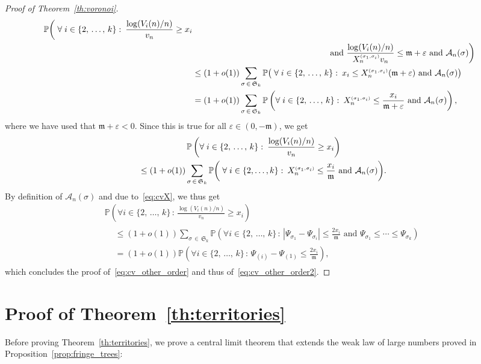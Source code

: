\documentclass[10pt]{amsart}
\theoremstyle{definition}\newtheorem{defi}[theo]{Definition}\newtheorem{rema}[theo]{Remark}\newtheorem{exam}[theo]{Example}\newtheorem{exem}[theo]{Example}\newtheorem{nota}[theo]{Notation}
\newcommand{\sss}{\ensuremath{\scriptscriptstyle}}
\newcommand{\bbP}{\mathbb{P}}
\newcommand{\clA}{\mathcal{A}}
\newcommand{\frkm}{\mathfrak{m}}
\newcommand{\frkS}{\mathfrak{S}}
\let\oldforall\forall
\renewcommand*{\forall}{\mathrel{\oldforall}}
\begin{document}
\begin{proof}[Proof of Theorem~\ref{th:voronoi}]
\begin{multline*}
\begin{aligned}
\bbP\bigg(\forall i \in \{2,\,\ldots,\,k\} \, \colon\,
\frac{\log (V_i(n)/n)}{v_n}\geq x_i \\
&\hskip16em\text{ and }
\frac{\log (V_i(n)/n)}{X_n^{\sss (\sigma_1,\sigma_i)}v_n}\leq \frkm+\varepsilon\text{ and }\clA_n(\sigma)\bigg)\\
&\leq (1+o(1))\sum_{\sigma\,\in\,\frkS_k}
\bbP\big(\forall i \in \{2,\,\ldots,\,k\} \, \colon\, x_i\leq X_n^{\sss (\sigma_1,\sigma_i)}(\frkm+\varepsilon)
\text{ and }\clA_n(\sigma)\big)\\
& = (1+o(1))\sum_{\sigma\,\in\,\frkS_k}
\bbP\left(\forall i \in \{2,\,\ldots,\,k\} \, \colon\, X_n^{\sss (\sigma_1,\sigma_i)}\leq \frac{x_i}{\frkm+\varepsilon}
\text{ and }\clA_n(\sigma)\right),
\end{aligned}
\end{multline*}
where we have used that $\frkm+\varepsilon<0$. Since this is true for all $\varepsilon\in(0,-\frkm)$, we get
\begin{multline*}
\bbP\left(\forall i \in \{2, \,\ldots,\, k\} \, \colon\, \frac{\log (V_i(n)/n)}{v_n}\geq x_i\right)
\\
\leq (1+o(1))\sum_{\sigma\,\in\,\frkS_k} \bbP\bigg(\forall i \in \{2, \ldots, k\} \, \colon\, X_n^{\sss (\sigma_1,\sigma_i)}\leq \frac{x_i}{\frkm}
\text{ and }\clA_n(\sigma)\bigg).
\end{multline*}
By definition of $\clA_n(\sigma)$ and due to~\eqref{eq:cvX}, we thus get
\begin{multline*}
\bbP\left(\forall i \in \{2, \,\ldots,\, k\} \, \colon\, \frac{\log (V_i(n)/n)}{v_n}\geq x_i\right)\\
\begin{aligned}
&\leq (1+o(1))\sum_{\sigma\,\in\,\frkS_k}
\bbP\left(\forall i \in \{2, \,\ldots,\, k\} \, \colon\, |\Psi_{\sigma_1}-\Psi_{\sigma_i}|\leq \frac{2x_i}{\frkm}
\text{ and }\Psi_{\sigma_1}\leq \cdots \leq \Psi_{\sigma_k}\right)\\
&= (1+o(1))\bbP\left(\forall i \in \{2,\,\ldots,\,k\} \, \colon\,
\Psi_{(i)}-\Psi_{(1)}\leq \frac{2x_i}{\frkm}\right),
\end{aligned}
\end{multline*}
which concludes the proof of~\eqref{eq:cv_other_order} and thus of~\eqref{eq:cv_other_order2}.
\end{proof}


\section{Proof of Theorem~\ref{th:territories}}\label{sec:territories}
Before proving Theorem~\ref{th:territories}, we prove a central limit theorem that extends the weak law of large numbers proved in Proposition~\ref{prop:fringe_trees}:
\end{document}
